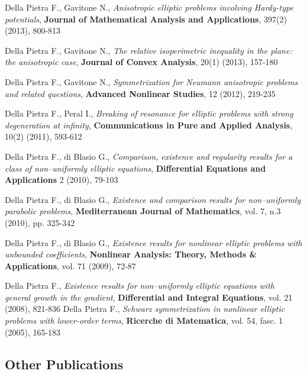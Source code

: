 \documentclass[11pt,a4paper,sans,colorlinks,linkcolor=green]{moderncv}
\begin{document}
 {Della Pietra F., Gavitone N., \textit{Anisotropic elliptic problems involving Hardy-type potentials}, \textbf{Journal of Mathematical
 Analysis and Applications}, 397(2) (2013), 800-813}

 {Della Pietra F., Gavitone N., \textit{The relative isoperimetric inequality in the plane: the anisotropic case},
 \textbf{Journal of Convex Analysis}, 20(1) (2013), 157-180}

 {Della Pietra F., Gavitone N., \textit{Symmetrization for Neumann anisotropic problems and related questions}, \textbf{Advanced
 Nonlinear Studies}, 12 (2012), 219-235}

 {Della Pietra F., Peral I., \textit{Breaking of resonance for elliptic problems with strong degeneration at infinity},
  \textbf{Communications in Pure and Applied Analysis}, 10(2) (2011),
  593-612}

 {Della Pietra F., di Blasio G., \textit{Comparison, existence and regularity results for a class of non--uniformly elliptic equations}, \textbf{Differential Equations and
  Applications} 2 (2010), 79-103}

 {Della Pietra F., di Blasio G., \textit{Existence and comparison results for non--uniformly parabolic problems},
  \textbf{Mediterranean Journal of Mathematics}, vol. 7, n.3 (2010),
  pp. 325-342}

 {Della Pietra F., di Blasio G., \textit{Existence
    results for nonlinear elliptic problems with unbounded
    coefficients}, \textbf{Nonlinear Analysis: Theory, Methods \&
  Applications}, vol. 71 (2009), 72-87}


 {Della Pietra F., \textit{Existence results for non--uniformly elliptic equations with general growth in the gradient}, \textbf{Differential and Integral Equations}, vol. 21 (2008),
  821-836}
 {Della Pietra F., \textit{Schwarz symmetrization in
    nonlinear elliptic problems with lower-order terms}, \textbf{Ricerche di
  Matematica}, vol. 54, fasc. 1 (2005), 165-183}

\subsection{{Other Publications}}
\end{document}
